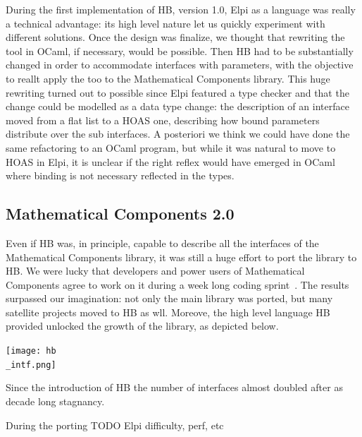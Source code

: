 \documentclass[a4paper, 11pt]{book}
\begin{document}
During the first implementation of HB, version 1.0, Elpi as a language was
really a technical advantage: its high level nature let us quickly experiment
with different solutions. Once the design was finalize, we thought that rewriting
the tool in OCaml, if necessary, would be possible. Then HB had to be substantially
changed in order to accommodate interfaces with parameters, with the objective
to reallt apply the too to the Mathematical Components library. This huge rewriting
turned out to possible since Elpi featured a type checker and that the change
could be modelled as a data type change: the description of an interface moved from
a flat list to a HOAS one, describing how bound parameters distribute over
the sub interfaces. A posteriori we think we could have done the same
refactoring to an OCaml program, but while it was natural to move to HOAS
in Elpi, it is unclear if the right reflex would have emerged in OCaml where
binding is not necessary reflected in the types.

\subsection{Mathematical Components 2.0}

Even if HB was, in principle, capable to describe all the interfaces of
the Mathematical Components library, it was still a huge effort to port the
library to HB.  We were lucky that developers and power users of
Mathematical Components agree to work on it during a week long coding
sprint~\cite{affeldt:hal-03463762}. The results surpassed our imagination:
not only the main library was ported, but many satellite projects moved to
HB as wll. Moreove, the high level language HB provided unlocked the
growth of the library, as depicted below. 

\texttt{[image: hb\\\_intf.png]}

Since the introduction of HB the number of interfaces almost doubled
after as decade long stagnancy.

During the porting TODO Elpi difficulty, perf, etc


\end{document}
